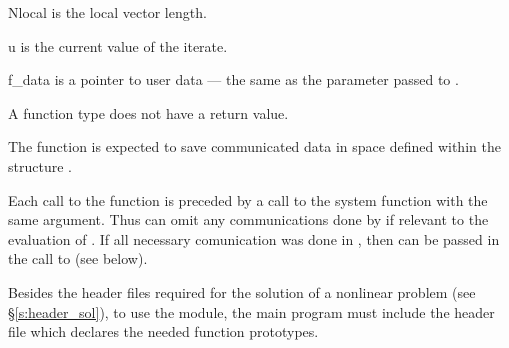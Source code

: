 {
  \begin{args}[Nlocal]
  \item[Nlocal] 
    is the local vector length.
  \item[u]
    is the current value of the iterate.
  \item[f\_data]
    is a pointer to user data --- the same as the       
    parameter passed to .  
  \end{args}
}
{
  A  function type does not have a return value.
}
{
  The  function is expected to save communicated data in space defined
  within the structure . 

  Each call to the  function is preceded by a call to the system function
   with the same  argument.  Thus  can omit 
  any communications done by  if relevant to the evaluation of .
  If all necessary comunication was done in , then 
  can be passed in the call to  (see below).
}

Besides the header files required for the solution of a nonlinear problem
(see \S\ref{s:header_sol}),  to use the {\kinbbdpre} module, the main program 
must include the header file  which declares the needed
function prototypes.

